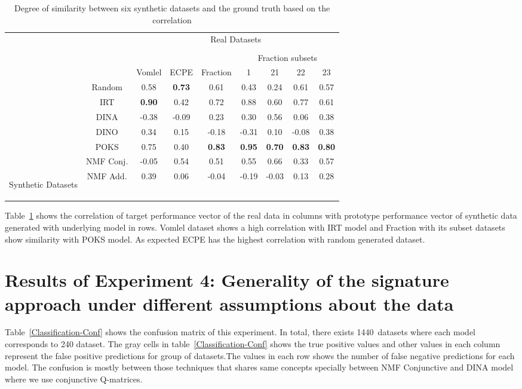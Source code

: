 \begin{table}[h]
 \center
\begin{tabular}{c|c|c|c|c|c|c|c|c|}

\multicolumn{2}{c}{}&\multicolumn{7}{c}{Real Datasets}\tabularnewline   
\multicolumn{9}{c}{}\tabularnewline   
\cline{6-9}
\multicolumn{5}{c|}{}&\multicolumn{4}{c|}{Fraction subsets}   \tabularnewline   
\cline{3-9} 
\multicolumn{2}{c|}{}   & Vomlel &ECPE &Fraction &1&21&22&23\tabularnewline
\cline{2-9}
\cline{2-9}
&Random & 0.58 &\textbf {0.73} & 0.61   & 0.43 & 0.24 & 0.61 & 0.57 \tabularnewline
\cline{2-9}
&IRT & \textbf {0.90} & 0.42 & 0.72   & 0.88 & 0.60 & 0.77 & 0.61 \tabularnewline
\cline{2-9}
&DINA & -0.38  & -0.09 &   0.23 &   0.30 & 0.56 & 0.06 & 0.38 \tabularnewline
\cline{2-9}
&DINO & 0.34 & 0.15  &  -0.18 &  -0.31 & 0.10 & -0.08 & 0.38 \tabularnewline
\cline{2-9}
&POKS & 0.75 &0.40  &  \textbf {0.83}  &  \textbf {0.95} &\textbf {0.70} & \textbf {0.83} & \textbf {0.80}\tabularnewline
\cline{2-9}
 &NMF Conj. & -0.05 & 0.54  & 0.51   & 0.55  & 0.66 & 0.33 & 0.57\tabularnewline
\cline{2-9}
\multicolumn{1}{c|}{\multirow{-7}{*}{\begin{sideways}Synthetic Datasets\end{sideways}}}&NMF Add. & 0.39 &0.06   & -0.04   & -0.19 & -0.03 & 0.13 & 0.28\tabularnewline
\cline{2-9}
\end{tabular}
\caption{Degree of similarity between six synthetic datasets and the ground truth based on the correlation}
\label{tablSynReal}
\end{table}



Table~\ref{tablSynReal} shows the correlation of target performance vector of the real data in columns with prototype performance vector of synthetic data generated with underlying model in rows. Vomlel dataset shows a high correlation with IRT model and Fraction with its subset datasets show similarity with POKS model. As expected ECPE has the highest correlation with random generated dataset.


\section{Results of Experiment 4: Generality of the signature approach under different assumptions about the data}
\label{GeneralityRes}
Table~\ref{Classification-Conf} shows the confusion matrix of this experiment. In total, there exists 1440~datasets where each model corresponds to 240 dataset. The gray cells in table~\ref{Classification-Conf} shows the true positive values and other values in each column represent the false positive predictions for group of datasets.The values in each row shows the number of false negative predictions for each model. The confusion is mostly between those techniques that shares same concepts specially between NMF Conjunctive and DINA model where we use conjunctive Q-matrices. 

